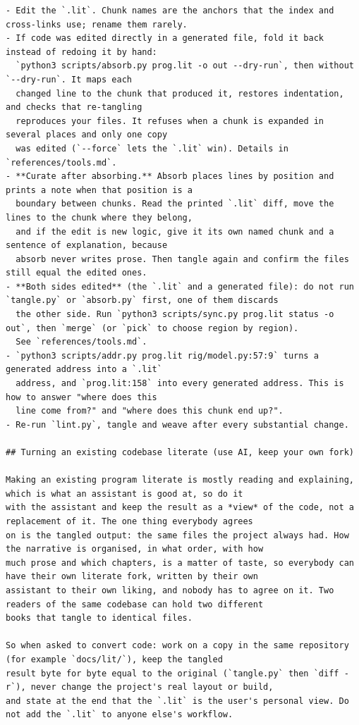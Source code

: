 \documentclass[10pt,a4paper]{article}
\newcounter{chunk}
\begin{document}
\begin{Verbatim}
- Edit the `.lit`. Chunk names are the anchors that the index and cross-links use; rename them rarely.
- If code was edited directly in a generated file, fold it back instead of redoing it by hand:
  `python3 scripts/absorb.py prog.lit -o out --dry-run`, then without `--dry-run`. It maps each
  changed line to the chunk that produced it, restores indentation, and checks that re-tangling
  reproduces your files. It refuses when a chunk is expanded in several places and only one copy
  was edited (`--force` lets the `.lit` win). Details in `references/tools.md`.
- **Curate after absorbing.** Absorb places lines by position and prints a note when that position is a
  boundary between chunks. Read the printed `.lit` diff, move the lines to the chunk where they belong,
  and if the edit is new logic, give it its own named chunk and a sentence of explanation, because
  absorb never writes prose. Then tangle again and confirm the files still equal the edited ones.
- **Both sides edited** (the `.lit` and a generated file): do not run `tangle.py` or `absorb.py` first, one of them discards
  the other side. Run `python3 scripts/sync.py prog.lit status -o out`, then `merge` (or `pick` to choose region by region).
  See `references/tools.md`.
- `python3 scripts/addr.py prog.lit rig/model.py:57:9` turns a generated address into a `.lit`
  address, and `prog.lit:158` into every generated address. This is how to answer "where does this
  line come from?" and "where does this chunk end up?".
- Re-run `lint.py`, tangle and weave after every substantial change.

## Turning an existing codebase literate (use AI, keep your own fork)

Making an existing program literate is mostly reading and explaining, which is what an assistant is good at, so do it
with the assistant and keep the result as a *view* of the code, not a replacement of it. The one thing everybody agrees
on is the tangled output: the same files the project always had. How the narrative is organised, in what order, with how
much prose and which chapters, is a matter of taste, so everybody can have their own literate fork, written by their own
assistant to their own liking, and nobody has to agree on it. Two readers of the same codebase can hold two different
books that tangle to identical files.

So when asked to convert code: work on a copy in the same repository (for example `docs/lit/`), keep the tangled
result byte for byte equal to the original (`tangle.py` then `diff -r`), never change the project's real layout or build,
and state at the end that the `.lit` is the user's personal view. Do not add the `.lit` to anyone else's workflow.


\end{Verbatim}
\end{document}

